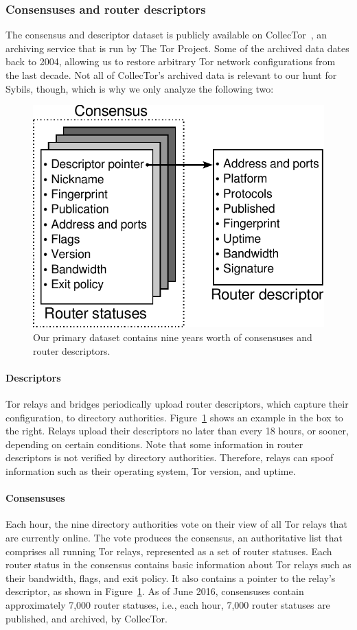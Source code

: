 \subsubsection{Consensuses and router descriptors}
The consensus and descriptor dataset is publicly available on
CollecTor~\cite{collector}, an archiving service that is run by The Tor Project.
Some of the archived data dates back to 2004, allowing us to restore arbitrary
Tor network configurations from the last decade.  Not all of CollecTor's
archived data is relevant to our hunt for Sybils, though, which is why we only
analyze the following two:

\begin{figure}[t]
	\centering
	\includegraphics[width=0.8\linewidth]{diagrams/consensus-and-descriptor.pdf}
	\caption{Our primary dataset contains nine years worth of consensuses and
	router descriptors.}
	\label{fig:datasets}
\end{figure}

\paragraph{Descriptors} Tor relays and bridges periodically upload router
descriptors, which capture their configuration, to directory authorities.
Figure~\ref{fig:datasets} shows an example in the box to the right.  Relays
upload their descriptors no later than every 18 hours, or sooner, depending on
certain conditions.  Note that some information in router descriptors is not
verified by directory authorities.  Therefore, relays can spoof information such
as their operating system, Tor version, and uptime.

\paragraph{Consensuses} Each hour, the nine directory authorities vote on their
view of all Tor relays that are currently online.  The vote produces the
consensus, an authoritative list that comprises all running Tor relays,
represented as a set of router statuses.  Each router status in the consensus
contains basic information about Tor relays such as their bandwidth, flags, and
exit policy.  It also contains a pointer to the relay's descriptor, as shown in
Figure~\ref{fig:datasets}.  As of June 2016, consensuses contain approximately
7,000 router statuses, i.e., each hour, 7,000 router statuses are published,
and archived, by CollecTor.

